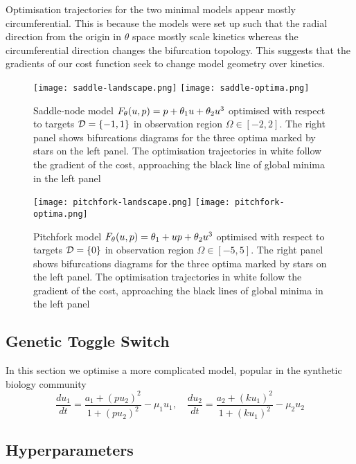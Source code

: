 Optimisation trajectories for the two minimal models appear mostly circumferential. This is because the models were set up such that the radial direction from the origin in $\theta$ space mostly scale kinetics whereas the circumferential direction changes the bifurcation topology. This suggests that the gradients of our cost function seek to change model geometry over kinetics.

\begin{figure}
\centering
\texttt{[image: saddle-landscape.png]}
\texttt{[image: saddle-optima.png]}
\caption{Saddle-node model $F_{\theta}(u,p) = p + \theta_{1}u+\theta_{2}u^3$ optimised with respect to targets $\mathcal{D}=\{-1,1\}$ in observation region $\Omega\in[-2,2]$. The right panel shows bifurcations diagrams for the three optima marked by stars on the left panel. The optimisation trajectories in white follow the gradient of the cost, approaching the black line of global minima in the left panel}
\label{fig:saddle-node:results}
\end{figure}

\begin{figure}
\centering
\texttt{[image: pitchfork-landscape.png]}
\texttt{[image: pitchfork-optima.png]}
\caption{Pitchfork model $F_{\theta}(u,p) = \theta_{1} + u p +\theta_{2}u^3$ optimised with respect to targets $\mathcal{D}=\{0\}$ in observation region $\Omega\in[-5,5]$. The right panel shows bifurcations diagrams for the three optima marked by stars on the left panel. The optimisation trajectories in white follow the gradient of the cost, approaching the black lines of global minima in the left panel}
\label{fig:pitchfork:results}
\end{figure}

\subsection{Genetic Toggle Switch}
In this section we optimise a more complicated model, popular in the synthetic biology community
\begin{equation}
    \dfrac{du_1}{dt} = \dfrac{a_1 + (p u_2)^2} { 1 + (p u_2)^2 } - \mu_1 u_1, \quad
    \dfrac{du_2}{dt} = \dfrac{a_2 + (k u_1)^2} { 1 + (k u_1)^2 } - \mu_2 u_2
\end{equation}


\subsection{Hyperparameters}


